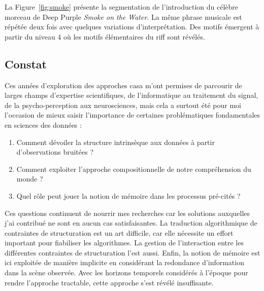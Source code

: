 
La Figure~\ref{fig:smoke} présente la segmentation de l'introduction du célèbre morceau de Deep Purple \emph{Smoke on the Water}. La même phrase musicale est répétée deux fois avec quelques variations d'interprétation. Des motifs émergent à partir du niveau 4 où les motifs élémentaires du riff sont révélés.

\subsection{Constat}

  Ces années d'exploration des approches casa m'ont permises de parcourir de larges champs d'expertise scientifiques, de l'informatique au traitement du signal, de la psycho-perception aux neurosciences, mais cela a surtout été pour moi l'occasion de mieux saisir l'importance de certaines problématiques fondamentales en sciences des données :
  \begin{enumerate}
    \item Comment dévoiler la structure intrinsèque aux données à partir d'observations bruitées ?
    \item Comment exploiter l'approche compositionnelle de notre compréhension du monde ?
    \item Quel rôle peut jouer la notion de mémoire dans les processus pré-cités ?
  \end{enumerate}
  Ces questions continuent de nourrir mes recherches car les solutions auxquelles j'ai contribué ne sont en aucun cas satisfaisantes. La traduction algorithmique de contraintes de structuration est un art difficile, car elle nécessite un effort important pour fiabiliser les algorithmes. La gestion de l'interaction entre les différentes contraintes de structuration l'est aussi. Enfin, la notion de mémoire est ici exploitée de manière implicite en considérant la redondance d'information dans la scène observée. Avec les horizons temporels considérés à l'époque pour rendre l'approche tractable, cette approche s'est révélé insuffisante.  %

